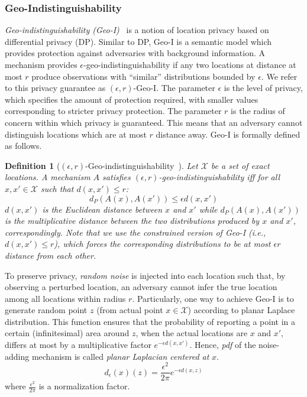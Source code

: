 \documentclass{USC-Thesis}
\numberwithin{equation}{chapter}
\begin{document}
\subsubsection{Geo-Indistinguishability}\label{sec:geo-i}
{\em Geo-indistinguishability (Geo-I)}~\cite{andres2013geo} is a notion of location privacy based on differential privacy (DP). Similar to DP, Geo-I is a semantic model which provides protection against adversaries with background information.
A mechanism provides $\epsilon$-geo-indistinguishability if any two locations at distance at most $r$ produce observations with ``similar'' distributions bounded by $\epsilon$. We refer to this privacy guarantee as $(\epsilon,r)$-Geo-I. The parameter $\epsilon$ is the level of privacy, which specifies the amount of protection required, with smaller values corresponding to stricter privacy protection. The parameter $r$ is the radius of concern within which privacy is guaranteed. This means that an adversary cannot distinguish locations which are at most $r$ distance away. Geo-I is formally defined as follows.

\newtheorem{geo-indistinguishability}[definition]{Definition}\label{geo-indistinguishability}
\begin{geo-indistinguishability}[$(\epsilon,r)$-Geo-indistinguishability~\cite{andres2013geo}]
Let $\mathcal{X}$ be a set of exact locations. A mechanism $A$ satisfies $(\epsilon,r)$-geo-indistinguishability iff for all $\mathit{x,x'\in \mathcal{X}}$ such that $\mathit{d(x,x')\le r}$:
$$d_P(A(x), A(x'))\le \epsilon d(x, x')$$
$d(x,x')$ is the Euclidean distance between $x$ and $x'$ while $d_P(A(x), A(x'))$ is the multiplicative distance between the two distributions produced by $x$ and $x'$, correspondingly. Note that we use the \emph{constrained} version of Geo-I (i.e., $\mathit{d(x,x')\le r}$), which forces the corresponding distributions to be at most $\epsilon r$ distance from each other.

\end{geo-indistinguishability}

To preserve privacy, \emph{random noise} is injected into each location such that, by observing a perturbed location, an adversary cannot infer the true location among all locations within radius $r$.
Particularly, one way to achieve Geo-I is to generate random point $z$ (from actual point $x\in \mathcal{X}$) according to planar Laplace distribution. This function ensures that the probability of reporting a point in a certain (infinitesimal) area around $z$, when the actual locations are $x$ and $x'$, differs at most by a multiplicative factor $e^{-\epsilon d(x,x')}$. Hence, \emph{pdf} of the noise-adding mechanism is called \emph{planar Laplacian centered at} $x$.
\begin{equation}
d_\epsilon(x)(z)=\frac{\epsilon^2}{2\pi}e^{-\epsilon d(x,z)}
\label{eq:pdf}
\end{equation}
where $\frac{\epsilon^2}{2\pi}$ is a normalization factor.
\end{document}
